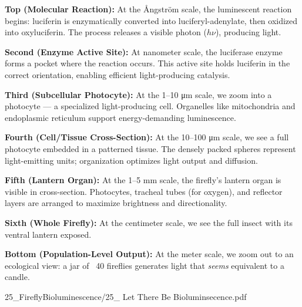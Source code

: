 \begin{SideNotePage}{
  \textbf{Top (Molecular Reaction):}  
  At the Ångström scale, the luminescent reaction begins: luciferin is enzymatically converted into luciferyl-adenylate, then oxidized into oxyluciferin. The process releases a visible photon ($h\nu$), producing light. \par

  \textbf{Second (Enzyme Active Site):}  
  At nanometer scale, the luciferase enzyme forms a pocket where the reaction occurs. This active site holds luciferin in the correct orientation, enabling efficient light-producing catalysis. \par

  \textbf{Third (Subcellular Photocyte):}  
  At the 1–10 μm scale, we zoom into a photocyte — a specialized light-producing cell. Organelles like mitochondria and endoplasmic reticulum support energy-demanding luminescence. \par

  \textbf{Fourth (Cell/Tissue Cross-Section):}  
  At the 10–100 μm scale, we see a full photocyte embedded in a patterned tissue. The densely packed spheres represent light-emitting units; organization optimizes light output and diffusion. \par

  \textbf{Fifth (Lantern Organ):}  
  At the 1–5 mm scale, the firefly's lantern organ is visible in cross-section. Photocytes, tracheal tubes (for oxygen), and reflector layers are arranged to maximize brightness and directionality. \par

  \textbf{Sixth (Whole Firefly):}  
  At the centimeter scale, we see the full insect with its ventral lantern exposed. \par

  \textbf{Bottom (Population-Level Output):}  
  At the meter scale, we zoom out to an ecological view: a jar of ~40 fireflies generates light that \textit{seems} equivalent to a candle.\par

}{25_FireflyBioluminescence/25_ Let There Be Bioluminsecence.pdf}
\end{SideNotePage}
